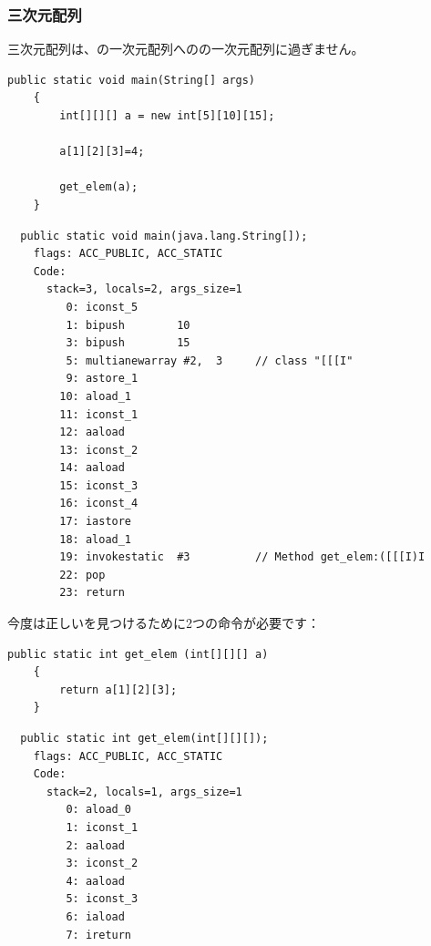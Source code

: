 \subsubsection{三次元配列}

三次元配列は、の一次元配列へのの一次元配列に過ぎません。


\begin{lstlisting}[style=customjava]
	public static void main(String[] args)
	{
		int[][][] a = new int[5][10][15];

		a[1][2][3]=4;

		get_elem(a);
	}
\end{lstlisting}

\begin{lstlisting}
  public static void main(java.lang.String[]);
    flags: ACC_PUBLIC, ACC_STATIC
    Code:
      stack=3, locals=2, args_size=1
         0: iconst_5      
         1: bipush        10
         3: bipush        15
         5: multianewarray #2,  3     // class "[[[I"
         9: astore_1      
        10: aload_1       
        11: iconst_1      
        12: aaload        
        13: iconst_2      
        14: aaload        
        15: iconst_3      
        16: iconst_4      
        17: iastore       
        18: aload_1       
        19: invokestatic  #3          // Method get_elem:([[[I)I
        22: pop           
        23: return        
\end{lstlisting}

今度は正しいを見つけるために2つの命令が必要です：


\begin{lstlisting}[style=customjava]
	public static int get_elem (int[][][] a)
	{
		return a[1][2][3];
	}
\end{lstlisting}

\begin{lstlisting}
  public static int get_elem(int[][][]);
    flags: ACC_PUBLIC, ACC_STATIC
    Code:
      stack=2, locals=1, args_size=1
         0: aload_0       
         1: iconst_1      
         2: aaload        
         3: iconst_2      
         4: aaload        
         5: iconst_3      
         6: iaload        
         7: ireturn       
\end{lstlisting}